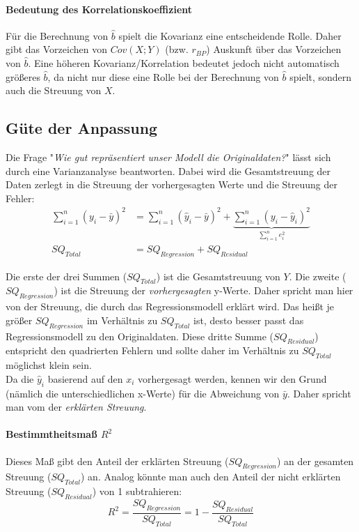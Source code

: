 \documentclass[a4paper]{article}
\newcommand\dangersign[1][2ex]{%
  \renewcommand\stacktype{L}%
  \scaleto{\stackon[1.3pt]{\color{red}$\triangle$}{\tiny !}}{#1}%
}
\begin{document}
\paragraph{Bedeutung des Korrelationskoeffizient} Für die Berechnung von $\hat{b}$ spielt die Kovarianz eine entscheidende Rolle. Daher gibt das Vorzeichen von $Cov(X;Y)$ (bzw. $r_{BP}$) Auskunft über das Vorzeichen von $\hat b$. Eine höheren Kovarianz/Korrelation bedeutet jedoch nicht automatisch größeres $\hat b$, da nicht nur diese eine Rolle bei der Berechnung von $\hat{b}$ spielt, sondern auch die Streuung von $X$.

\subsection{Güte der Anpassung}\label{sec:goodness-of-fit}
Die Frage "\textit{Wie gut repräsentiert unser Modell die Originaldaten?}" lässt sich durch eine Varianzanalyse beantworten. Dabei wird die Gesamtstreuung der Daten zerlegt in die Streuung der vorhergesagten Werte und die Streuung der Fehler:
\begin{align*}
    \sum_{i=1}^n(y_i-\bar{y})^2&=\sum_{i=1}^n(\hat{y}_i-\bar{y})^2 + \underbrace{\sum_{i=1}^n(y_i-\hat{y}_i)^2}_{\sum_{i=1}^n e_i^2}\\
    SQ_{Total}&=SQ_{Regression}+SQ_{Residual}
\end{align*}

\noindent Die erste der drei Summen ($SQ_{Total}$) ist die Gesamtstreuung von $Y$. Die zweite ($SQ_{Regression}$) ist die Streuung der \textit{vorhergesagten} y-Werte. Daher spricht man hier von der Streuung, die durch das Regressionsmodell erklärt wird. Das heißt je größer $SQ_{Regression}$ im Verhältnis zu $SQ_{Total}$ ist, desto besser passt das Regressionsmodell zu den Originaldaten. Diese dritte Summe ($SQ_{Residual}$) entspricht den quadrierten Fehlern und sollte daher im Verhältnis zu $SQ_{Total}$ möglichst klein sein.\\

\noindent \dangersign[3ex] Da die $\hat y_i$ basierend auf den $x_i$ vorhergesagt werden, kennen wir den Grund (nämlich die unterschiedlichen x-Werte) für die Abweichung von $\bar y$. Daher spricht man vom der \textit{erklärten Streuung}.

\paragraph{Bestimmtheitsmaß $R^2$} Dieses Maß gibt den Anteil der erklärten Streuung ($SQ_{Regression}$) an der gesamten Streuung ($SQ_{Total}$) an. Analog könnte man auch den Anteil der nicht erklärten Streuung ($SQ_{Residual}$) von 1 subtrahieren:
$$R^2 = \frac{SQ_{Regression}}{SQ_{Total}} = 1 - \frac{SQ_{Residual}}{SQ_{Total}}$$
\end{document}
